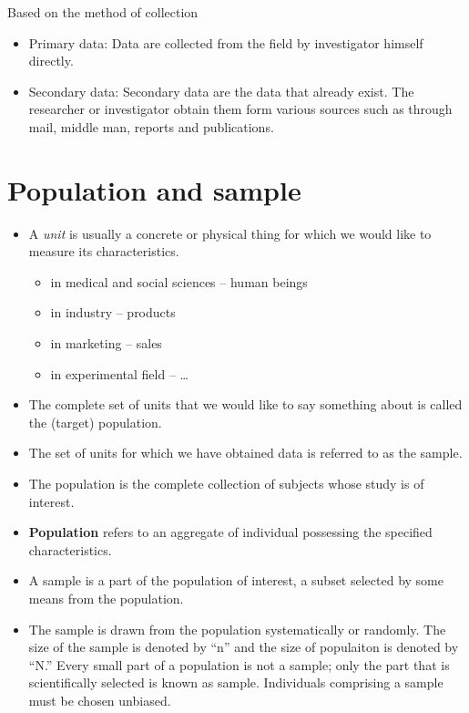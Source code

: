 \documentclass[
  ignorenonframetext,
  aspectratio=169]{beamer}
\providecommand{\tightlist}{%
  \setlength{\itemsep}{0pt}\setlength{\parskip}{0pt}}
\begin{document}
\begin{frame}{Based on the method of collection}
\protect\hypertarget{based-on-the-method-of-collection}{}
\begin{itemize}
\tightlist
\item
  Primary data: Data are collected from the field by investigator
  himself directly.
\item
  Secondary data: Secondary data are the data that already exist. The
  researcher or investigator obtain them form various sources such as
  through mail, middle man, reports and publications.
\end{itemize}
\end{frame}

\hypertarget{population-and-sample}{%
\section{Population and sample}\label{population-and-sample}}

\begin{frame}{}
\protect\hypertarget{section-2}{}
\begin{itemize}
\tightlist
\item
  A \alert{\textit{unit}} is usually a concrete or physical thing for
  which we would like to measure its characteristics.

  \begin{itemize}
  \tightlist
  \item
    in medical and social sciences -- human beings
  \item
    in industry -- products
  \item
    in marketing -- sales
  \item
    in experimental field -- \ldots{}
  \end{itemize}
\item
  The complete set of units that we would like to say something about is
  called the (target) \alert{population}.
\item
  The set of units for which we have obtained data is referred to as the
  \alert{sample}.
\end{itemize}

\footnotesize

\begin{itemize}
\tightlist
\item
  The population is the complete collection of subjects whose study is
  of interest.
\item
  \textbf{Population} refers to an aggregate of individual possessing
  the specified characteristics.
\item
  A sample is a part of the population of interest, a subset selected by
  some means from the population.
\item
  The sample is drawn from the population systematically or randomly.
  The size of the sample is denoted by ``n'' and the size of populaiton
  is denoted by ``N.'' Every small part of a population is not a sample;
  only the part that is scientifically selected is known as sample.
  Individuals comprising a sample must be chosen unbiased.
\end{itemize}
\end{frame}
\end{document}
